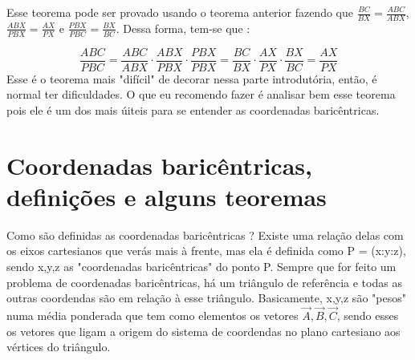 \documentclass{article}
\begin{document}
Esse teorema pode ser provado usando o teorema anterior fazendo que $\frac{BC}{BX} = \frac{ABC}{ABX}$,$\frac{ABX}{PBX} = \frac{AX}{PX}$ e $\frac{PBX}{PBC} = \frac{BX}{BC}$. Dessa forma, tem-se que :

$$
\frac{ABC}{PBC} = \frac{ABC}{ABX} \cdot \frac{ABX}{PBX} \cdot \frac{PBX}{PBX} = \frac{BC}{BX} \cdot \frac{AX}{PX} \cdot \frac{BX}{BC} = \frac{AX}{PX}

$$
Esse é o teorema mais "difícil" de decorar nessa parte introdutória, então, é normal ter dificuldades. O que eu recomendo fazer é analisar bem esse teorema pois ele é um dos mais úiteis para se entender as coordenadas baricêntricas.

\section{Coordenadas baricêntricas, definições e alguns teoremas}

Como são definidas as coordenadas baricêntricas ? Existe uma relação delas com os eixos cartesianos que verás mais à frente, mas ela é definida como P = (x:y:z), sendo x,y,z as "coordenadas baricêntricas" do ponto P. Sempre que for feito um problema de coordenadas baricêntricas, há um triângulo de referência e todas as outras coordendas são em relação à esse triângulo. Basicamente, x,y,z são "pesos" numa média ponderada que tem como elementos os vetores $\overrightarrow{A}, \overrightarrow{B}, \overrightarrow{C}$, sendo esses os vetores que ligam a origem do sistema de coordendas no plano cartesiano aos vértices do triângulo.
\begin{center}
\end{center}
\end{document}
